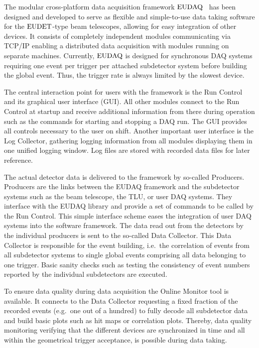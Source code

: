 
The modular cross-platform data acquisition framework $\textrm{EUDAQ}$~\cite{ref:eudaqwebsite} has been designed and developed to serve as flexible and simple-to-use data taking software for the $\textrm{EUDET}$-type beam telescopes,
 allowing for easy integration of other devices. 
It consists of completely independent modules communicating via TCP/IP enabling a distributed data acquisition with modules running on separate machines. 
Currently, $\textrm{EUDAQ}$ is designed for synchronous DAQ systems requiring one event per trigger per attached subdetector system before building the global event. 
Thus, the trigger rate is always limited by the slowest device.

The central interaction point for users with the framework is the Run Control and its graphical user interface (GUI). 
All other modules connect to the Run Control at startup and receive additional information from there during operation such as the commands for starting and stopping a DAQ run. 
The GUI provides all controls necessary to the user on shift. 
Another important user interface is the Log Collector, gathering logging information from all modules displaying them in one unified logging window. 
Log files are stored with recorded data files for later reference.

The actual detector data is delivered to the framework by so-called Producers.
Producers are the links between the EUDAQ framework and the subdetector systems such as the beam telescope, the TLU, or user DAQ systems.
They interface with the EUDAQ library and provide a set of commands to be called by the Run Control. 
This simple interface scheme eases the integration of user DAQ systems into the software framework.
The data read out from the detectors by the individual producers is sent to the so-called Data Collector. 
This Data Collector is responsible for the event building, i.e.\ the correlation of events from all subdetector systems to single global events comprising all data belonging to one trigger. 
Basic sanity checks such as testing the consistency of event numbers reported by the individual subdetectors are executed.

To ensure data quality during data acquisition the Online Monitor tool is available. 
It connects to the Data Collector requesting a fixed fraction of the recorded events (e.g.\ one out of a hundred) to fully decode all subdetector data
 and build basic plots such as hit maps or correlation plots.
Thereby, data quality monitoring verifying that the different devices are synchronized in time and all within the geometrical trigger acceptance, is possible during data taking.

